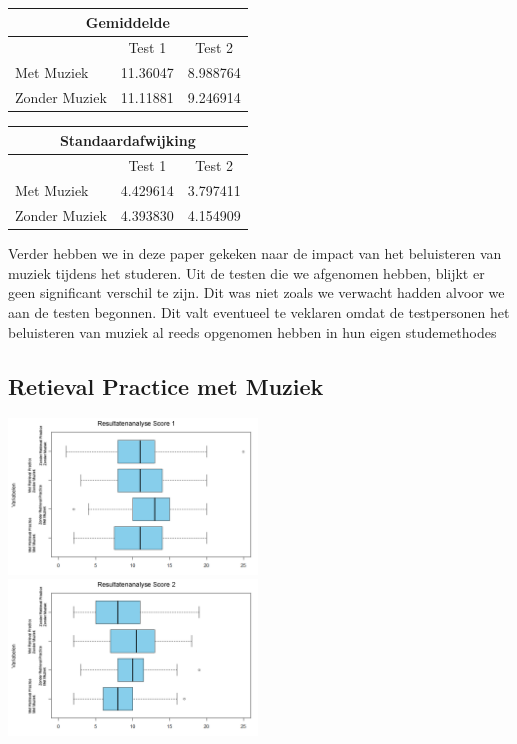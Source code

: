 \documentclass{hogent-article}
\begin{document}
	\begin{tabular}{ |p{10em}|c|c| }
	\hline
		\multicolumn{3}{|c|}{Gemiddelde} \\
	\hline
		& Test 1 & Test 2 \\
	\hline
		Met Muziek & 11.36047 & 8.988764 \\
		Zonder Muziek & 11.11881 & 9.246914 \\
	\hline
	\end{tabular}

	\begin{tabular}{ |p{10em}|c|c| }
	\hline
		\multicolumn{3}{|c|}{Standaardafwijking} \\
	\hline
		& Test 1 & Test 2 \\
	\hline
		Met Muziek & 4.429614 & 3.797411 \\
		Zonder Muziek & 4.393830 & 4.154909 \\
	\hline
	\end{tabular}

	Verder hebben we in deze paper gekeken naar de impact van het beluisteren van muziek tijdens het studeren. Uit de testen die we afgenomen hebben, blijkt er geen significant verschil te zijn. Dit was niet zoals we verwacht hadden alvoor we aan de testen begonnen. Dit valt eventueel te veklaren omdat de testpersonen het beluisteren van muziek al reeds opgenomen hebben in hun eigen studemethodes
	
	\subsection{Retieval Practice met Muziek}
	\includegraphics[width=250px]{Final_boxplots_Score1}
	\includegraphics[width=250px]{Final_boxplots_Score2}
	
\end{document}
